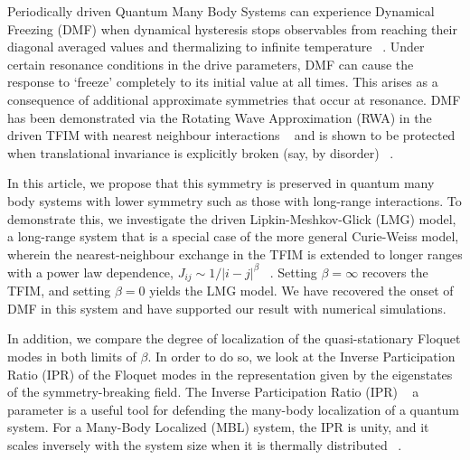 \documentclass[%
reprint,
superscriptaddress,
amsmath,amssymb,
aps,
prb,
]{revtex4-2}
\begin{document}
	\maketitle
	
	
	Periodically driven Quantum Many Body Systems can experience Dynamical Freezing (DMF) when  dynamical hysteresis stops observables from reaching their diagonal averaged values and thermalizing to infinite temperature ~\cite{bordia_periodically_2017, sahoo_periodically_2019, das_exotic_2010}. Under certain resonance conditions in the drive parameters, DMF can cause the response to ‘freeze’ completely to its initial value at all times. This arises as a consequence of additional approximate symmetries that occur at resonance. DMF has been demonstrated via the Rotating Wave Approximation (RWA) in the driven TFIM with nearest neighbour interactions ~\cite{mbeng_quantum_2020} and is shown to be protected when translational invariance is explicitly broken (say, by disorder) ~\cite{yamada_localization_2022, roy_fate_2015}. 
	
	In this article, we propose that this symmetry is preserved in quantum many body systems with lower symmetry such as those with long-range interactions. To demonstrate this, we investigate the driven Lipkin-Meshkov-Glick (LMG) model, a long-range system that is a special case of the more general Curie-Weiss model, wherein the nearest-neighbour exchange in the TFIM is extended to longer ranges with a power law dependence, $J_{ij}\sim 1/|i-j|^\beta$  ~\cite{campa_statistical_2009, eisele_multiple_1988, canning_class_1992}. Setting $\beta=\infty$ recovers the TFIM, and setting $\beta=0$ yields the LMG model. We have recovered the onset of DMF in this system and have supported our result with numerical simulations.
	
	In addition, we compare the degree of localization of the quasi-stationary Floquet modes in both limits of $\beta$. In order to do so, we look at the Inverse Participation Ratio (IPR) of the Floquet modes in the representation given by the eigenstates of the symmetry-breaking field. The Inverse Participation Ratio (IPR) ~\cite{Misguich2016} a parameter is a useful tool for defending the many-body localization of a quantum system. For a Many-Body Localized (MBL) system, the IPR is unity, and it scales inversely with the system size when it is thermally distributed ~\cite{calixto_inverse_2015}.
	
\end{document}
